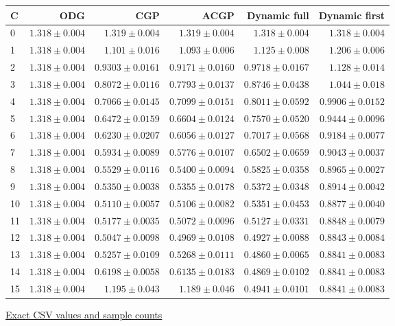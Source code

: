 \begin{center}{\scriptsize\setlength{\tabcolsep}{3pt}
\begin{tabular}{lrrrrr}
\toprule
C & ODG & CGP & ACGP & Dynamic full & Dynamic first \\
\midrule
0 & $1.318\pm0.004$ & $1.319\pm0.004$ & $1.319\pm0.004$ & $1.318\pm0.004$ & $1.318\pm0.004$ \\
1 & $1.318\pm0.004$ & $1.101\pm0.016$ & $1.093\pm0.006$ & $1.125\pm0.008$ & $1.206\pm0.006$ \\
2 & $1.318\pm0.004$ & $0.9303\pm0.0161$ & $0.9171\pm0.0160$ & $0.9718\pm0.0167$ & $1.128\pm0.014$ \\
3 & $1.318\pm0.004$ & $0.8072\pm0.0116$ & $0.7793\pm0.0137$ & $0.8746\pm0.0438$ & $1.044\pm0.018$ \\
4 & $1.318\pm0.004$ & $0.7066\pm0.0145$ & $0.7099\pm0.0151$ & $0.8011\pm0.0592$ & $0.9906\pm0.0152$ \\
5 & $1.318\pm0.004$ & $0.6472\pm0.0159$ & $0.6604\pm0.0124$ & $0.7570\pm0.0520$ & $0.9444\pm0.0096$ \\
6 & $1.318\pm0.004$ & $0.6230\pm0.0207$ & $0.6056\pm0.0127$ & $0.7017\pm0.0568$ & $0.9184\pm0.0077$ \\
7 & $1.318\pm0.004$ & $0.5934\pm0.0089$ & $0.5776\pm0.0107$ & $0.6502\pm0.0659$ & $0.9043\pm0.0037$ \\
8 & $1.318\pm0.004$ & $0.5529\pm0.0116$ & $0.5400\pm0.0094$ & $0.5825\pm0.0358$ & $0.8965\pm0.0027$ \\
9 & $1.318\pm0.004$ & $0.5350\pm0.0038$ & $0.5355\pm0.0178$ & $0.5372\pm0.0348$ & $0.8914\pm0.0042$ \\
10 & $1.318\pm0.004$ & $0.5110\pm0.0057$ & $0.5106\pm0.0082$ & $0.5351\pm0.0453$ & $0.8877\pm0.0040$ \\
11 & $1.318\pm0.004$ & $0.5177\pm0.0035$ & $0.5072\pm0.0096$ & $0.5127\pm0.0331$ & $0.8848\pm0.0079$ \\
12 & $1.318\pm0.004$ & $0.5047\pm0.0098$ & $0.4969\pm0.0108$ & $0.4927\pm0.0088$ & $0.8843\pm0.0084$ \\
13 & $1.318\pm0.004$ & $0.5257\pm0.0109$ & $0.5268\pm0.0111$ & $0.4860\pm0.0065$ & $0.8841\pm0.0083$ \\
14 & $1.318\pm0.004$ & $0.6198\pm0.0058$ & $0.6135\pm0.0183$ & $0.4869\pm0.0102$ & $0.8841\pm0.0083$ \\
15 & $1.318\pm0.004$ & $1.195\pm0.043$ & $1.189\pm0.046$ & $0.4941\pm0.0101$ & $0.8841\pm0.0083$ \\
\bottomrule\end{tabular}}
{\footnotesize\href{https://github.com/sanjeevkrishnaa/Compiler-Driven-ACE/blob/codex/ace-scheduler-correctness/docs/latex/qft96_final/data/allocation_mesh_shortest_reliable_m16.csv}{Exact CSV values and sample counts}}
\end{center}
